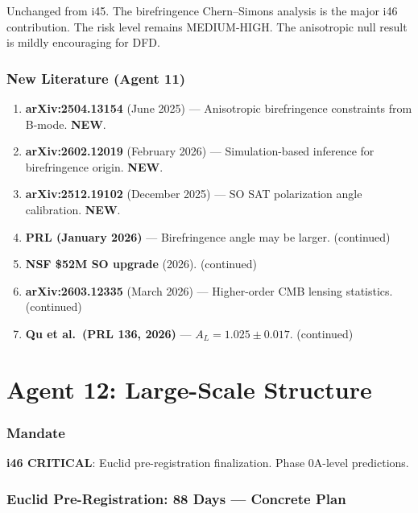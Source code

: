 \documentclass[11pt,a4paper]{article}
\newcommand{\NEW}{\textcolor{dfdblue}{\textbf{NEW}}}
\begin{document}
Unchanged from i45. The birefringence Chern--Simons analysis is the major i46 contribution. The risk level remains MEDIUM-HIGH. The anisotropic null result is mildly encouraging for DFD.

\section{New Literature (Agent 11)}

\begin{enumerate}
\item \textbf{arXiv:2504.13154} (June 2025) --- Anisotropic birefringence constraints from B-mode. \NEW.
\item \textbf{arXiv:2602.12019} (February 2026) --- Simulation-based inference for birefringence origin. \NEW.
\item \textbf{arXiv:2512.19102} (December 2025) --- SO SAT polarization angle calibration. \NEW.
\item \textbf{PRL (January 2026)} --- Birefringence angle may be larger. (continued)
\item \textbf{NSF \$52M SO upgrade} (2026). (continued)
\item \textbf{arXiv:2603.12335} (March 2026) --- Higher-order CMB lensing statistics. (continued)
\item \textbf{Qu et al.\ (PRL 136, 2026)} --- $A_L = 1.025 \pm 0.017$. (continued)
\end{enumerate}


\part{Agent 12: Large-Scale Structure}
\label{part:agent12}

\section{Mandate}

\textbf{i46 CRITICAL}: Euclid pre-registration finalization. Phase 0A-level predictions.

\section{Euclid Pre-Registration: 88 Days --- Concrete Plan}
\end{document}
